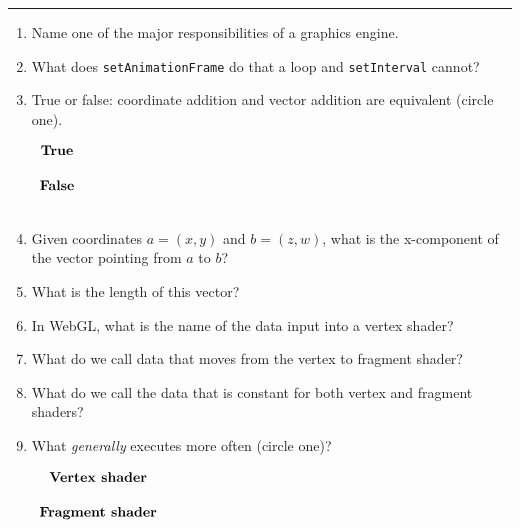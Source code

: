 \documentclass[11pt]{article}
\begin{document}
\Large



\medskip\hrule
\begin{enumerate}[start=0]

\item Name one of the major responsibilities of a graphics engine.
\vspace*{50px}

\item What does \texttt{setAnimationFrame} do that a loop and \texttt{setInterval} cannot?
\vspace*{50px}

\item True or false: coordinate addition and vector addition are equivalent (circle one).
\begin{center}
$%
\begin{array}{ccccc}
\textbf{True}
\\
\vspace*{1px}
\\
\textbf{False}
\\
\vspace*{1px}
\\
\end{array}%
$
\end{center}

\item Given coordinates $a = (x, y)$ and $b = (z, w)$, what is the x-component of the vector pointing from $a$ to $b$?
\vspace*{25px}

\item What is the length of this vector?
\vspace*{25px}

\item In WebGL, what is the name of the data input into a vertex shader?
\vspace*{25px}

\item What do we call data that moves from the vertex to fragment shader?
\vspace*{25px}

\item What do we call the data that is constant for both vertex and fragment shaders?
\vspace*{25px}

\newpage

\item What \textit{generally} executes more often (circle one)?
\begin{center}
$%
\begin{array}{ccccc}
\textbf{Vertex shader}
\\
\vspace*{1px}
\\
\textbf{Fragment shader}
\\
\vspace*{1px}
\\
\end{array}%
$
\end{center}


\end{enumerate}
\end{document}
